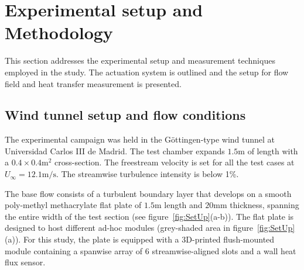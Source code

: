 \section{Experimental setup and Methodology \label{s:Methodology}}

This section addresses the experimental setup and measurement techniques employed in the study. The actuation system is outlined and the setup for flow field and heat transfer measurement is presented. 

\subsection{Wind tunnel setup and flow conditions \label{ss:WTandBLcond}}%
%
The experimental campaign was held in the G\"ottingen-type wind tunnel at Universidad Carlos III de Madrid. The test chamber expands $1.5\mathrm{m}$ of length with a $0.4 \times 0.4\mathrm{m}^2$ cross-section. The freestream velocity is set for all the test cases at $U_\infty = 12.1\mathrm{m/s}$. The streamwise turbulence intensity is below 1\%.  

The base flow consists of a turbulent boundary layer that develops on a smooth poly-methyl methacrylate flat plate of $1.5\mathrm{m}$ length and $20\mathrm{mm}$ thickness, spanning the entire width of the test section (see figure~\ref{fig:SetUp}(a-b)). The flat plate is designed to host different ad-hoc modules (grey-shaded area in figure~\ref{fig:SetUp}(a)). For this study, the plate is equipped with a 3D-printed flush-mounted module containing a spanwise array of $6$ streamwise-aligned slots and a wall heat flux sensor.


